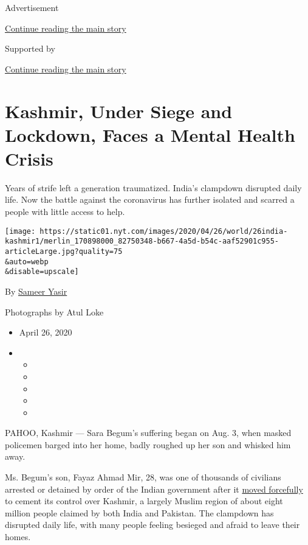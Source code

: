 Advertisement

\protect\hyperlink{after-top}{Continue reading the main story}

Supported by

\protect\hyperlink{after-sponsor}{Continue reading the main story}

\hypertarget{kashmir-under-siege-and-lockdown-faces-a-mental-health-crisis}{%
\section{Kashmir, Under Siege and Lockdown, Faces a Mental Health
Crisis}\label{kashmir-under-siege-and-lockdown-faces-a-mental-health-crisis}}

Years of strife left a generation traumatized. India's clampdown
disrupted daily life. Now the battle against the coronavirus has further
isolated and scarred a people with little access to help.

\texttt{[image: https://static01.nyt.com/images/2020/04/26/world/26india-kashmir1/merlin\_170898000\_82750348-b667-4a5d-b54c-aaf52901c955-articleLarge.jpg?quality=75\\\&auto=webp\\\&disable=upscale]}

By \href{https://www.nytimes.com/by/sameer-yasir}{Sameer Yasir}

Photographs by Atul Loke

\begin{itemize}
\item
  April 26, 2020
\item
  \begin{itemize}
  \item
  \item
  \item
  \item
  \item
  \end{itemize}
\end{itemize}

PAHOO, Kashmir --- Sara Begum's suffering began on Aug. 3, when masked
policemen barged into her home, badly roughed up her son and whisked him
away.

Ms. Begum's son, Fayaz Ahmad Mir, 28, was one of thousands of civilians
arrested or detained by order of the Indian government after it
\href{https://www.nytimes.com/2019/08/05/world/asia/india-pakistan-kashmir-jammu.html}{moved
forcefully} to cement its control over Kashmir, a largely Muslim region
of about eight million people claimed by both India and Pakistan. The
clampdown has disrupted daily life, with many people feeling besieged
and afraid to leave their homes.

